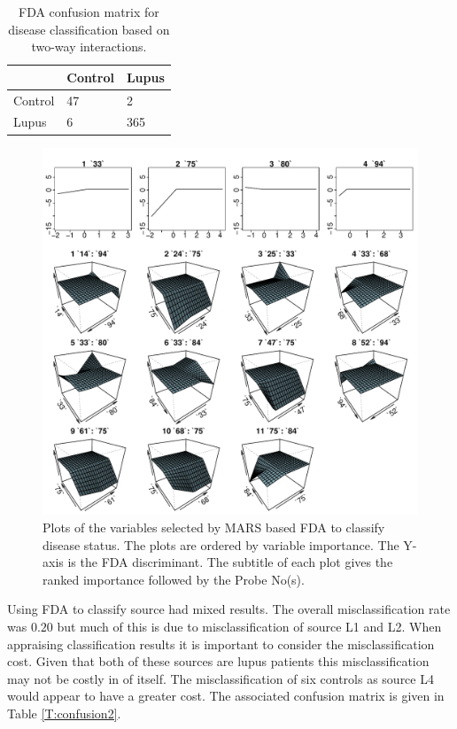 \documentclass[a4paper, 12pt]{report}
\begin{document}
\begin{table}[h]
\centering
\begin{tabular}{lll}
  \hline
 & Control & Lupus \\ 
  \hline
Control &  47 &  2 \\ 
  Lupus &   6 & 365 \\ 
   \hline
\end{tabular}
\caption{FDA confusion matrix for disease classification based on two-way interactions.} 
\label{T:confusion1}
\end{table}

\begin{figure}[H]
\begin{center}
\includegraphics[width=\textwidth]{MARS.pdf}
\caption{Plots of the variables selected by MARS based FDA to classify disease status. The plots are ordered by variable importance. The Y-axis is the FDA discriminant. The subtitle of each plot gives the ranked importance followed by the Probe No(s).}
\label{F:MARS}
\end{center}
\end{figure}

Using \gls{FDA} to classify source had mixed results. The overall misclassification rate was $0.20$ but much of this is due to misclassification of source L1 and L2. When appraising classification results it is important to consider the misclassification cost. Given that both of these sources are lupus patients this misclassification may not be costly in of itself. The misclassification of six controls as source L4 would appear to have a greater cost. The associated confusion matrix is given in Table \ref{T:confusion2}. 
\end{document}
